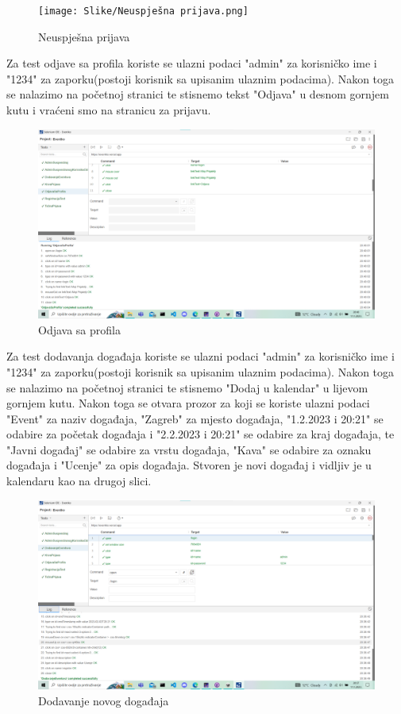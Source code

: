  			\begin{figure}[H]
 				\texttt{[image: Slike/Neuspješna prijava.png]}
 				\caption{Neuspješna prijava}
 			\end{figure}
 		
 			\indent Za test odjave sa profila koriste se ulazni podaci "admin" za korisničko ime i "1234" za zaporku(postoji korisnik sa upisanim ulaznim podacima). Nakon toga se nalazimo na početnoj stranici te stisnemo tekst "Odjava" u desnom gornjem kutu i vraćeni smo na stranicu za prijavu.
 			
 			\begin{figure}[H]
 				\includegraphics[width=\textwidth]{Slike/OdjavaSaProfila.png}
 				\caption{Odjava sa profila}
 			\end{figure}
 		
 			\indent Za test dodavanja događaja koriste se ulazni podaci "admin" za korisničko ime i "1234" za zaporku(postoji korisnik sa upisanim ulaznim podacima). Nakon toga se nalazimo na početnoj stranici te stisnemo "Dodaj u kalendar" u lijevom gornjem kutu. Nakon toga se otvara prozor za koji se koriste ulazni podaci "Event" za naziv događaja, "Zagreb" za mjesto događaja, "1.2.2023 i 20:21" se odabire za početak događaja i "2.2.2023 i 20:21" se odabire za kraj događaja, te "Javni događaj" se odabire za vrstu događaja, "Kava" se odabire za oznaku događaja i "Ucenje" za opis događaja. Stvoren je novi događaj i vidljiv je u kalendaru kao na drugoj slici.
 			\begin{figure}[H]
 				\includegraphics[width=\textwidth]{Slike/DodavanjeEventova.png}
 				\caption{Dodavanje novog događaja}
 			\end{figure}
 		
